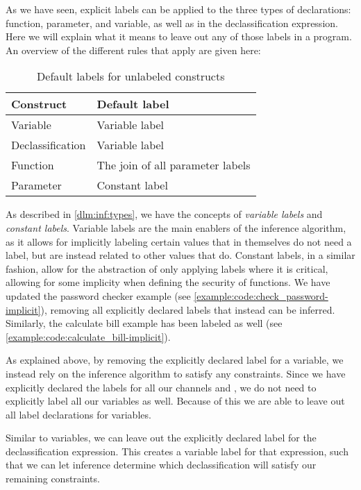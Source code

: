 As we have seen, explicit labels can be applied to the three types of declarations: function, parameter, and variable, as well as in the declassification expression.
Here we will explain what it means to leave out any of those labels in a program.
An overview of the different rules that apply are given here:
\begin{table}[H]
  \centering
  \begin{tabular}{|l|l|}
    \hline
    \textbf{Construct} & \textbf{Default label} \\ \hline \hline
    Variable & Variable label \\ \hline
    Declassification & Variable label \\ \hline
    Function & The join of all parameter labels \\ \hline
    Parameter & Constant label \\ \hline
  \end{tabular}
  \caption{Default labels for unlabeled constructs}
  \label{informal:table:default_labels}
\end{table}

As described in \cref{dlm:inf:types}, we have the concepts of \emph{variable labels} and \emph{constant labels}.
Variable labels are the main enablers of the inference algorithm, as it allows for implicitly labeling certain values that in themselves do not need a label, but are instead related to other values that do.
Constant labels, in a similar fashion, allow for the abstraction of only applying labels where it is critical, allowing for some implicity when defining the security of functions.
We have updated the password checker example (see \cref{example:code:check_password-implicit}), removing all explicitly declared labels that instead can be inferred.
Similarly, the calculate bill example has been labeled as well (see \cref{example:code:calculate_bill-implicit}).

As explained above, by removing the explicitly declared label for a variable, we instead rely on the inference algorithm to satisfy any constraints.
Since we have explicitly declared the labels for all our channels and , we do not need to explicitly label all our variables as well.
Because of this we are able to leave out all label declarations for variables.

Similar to variables, we can leave out the explicitly declared label for the declassification expression.
This creates a variable label for that expression, such that we can let inference determine which declassification will satisfy our remaining constraints.

